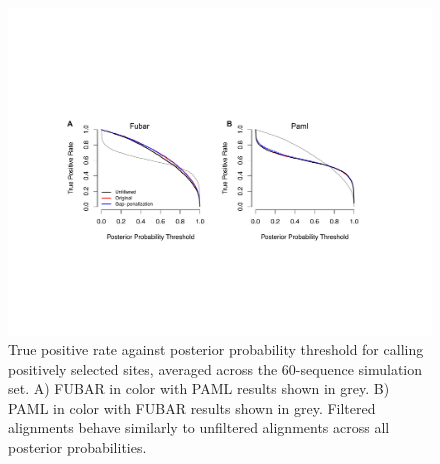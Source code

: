 \documentclass[10pt]{article}
\begin{document}
\begin{figure}[H]
\centerline{\includegraphics[width=7in]{Figures/fulltpr.pdf}}
\caption{\label{fulltpr} True positive rate against posterior probability threshold for calling positively selected sites, averaged across the 60-sequence simulation set. A) FUBAR in color with PAML results shown in grey. B) PAML in color with FUBAR results shown in grey. Filtered alignments behave similarly to unfiltered alignments across all posterior probabilities.}
\end{figure}
\end{document}
